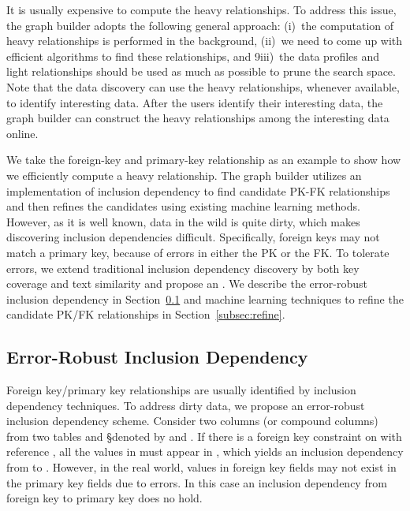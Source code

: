 It is usually expensive to compute the heavy relationships. 
To address this issue, the graph builder adopts  the following general approach: 
(i)~the computation of heavy relationships is performed in the background, 
(ii)~we need to come up with efficient algorithms to find these relationships, and
9iii)~the data profiles and light relationships should be used as much as possible to prune the search space. 
Note that the data discovery can use the heavy relationships, whenever available, to identify interesting data. 
After the users identify their interesting data, the graph builder can construct the heavy relationships among the interesting data online.


We take the foreign-key and primary-key relationship as an example to show how we efficiently compute a heavy relationship. 
The graph builder utilizes an implementation of inclusion dependency to find candidate PK-FK relationships and then refines the candidates using existing machine learning methods. 
However, as it is well known, data in the wild is quite dirty, which makes discovering inclusion dependencies difficult. Specifically, foreign keys may not match a primary key, because of errors in either the PK or the FK. To tolerate errors, we extend traditional inclusion dependency discovery by both key coverage and text similarity and propose an \emph{\eind}. We describe the error-robust inclusion dependency in Section~\ref{subsec:eind} and machine learning techniques to refine the candidate PK/FK relationships in Section~\ref{subsec:refine}.


\subsection{Error-Robust Inclusion Dependency}\label{subsec:eind}

Foreign key/primary key relationships are usually identified by inclusion dependency techniques. 
To address dirty data, we propose an error-robust inclusion dependency scheme.
Consider two columns (or compound columns) from two tables \R and \S denoted by \RX and \SY. If there is a foreign key constraint on \RX with reference \SY, all the values in \RX must appear in \SY, which yields an inclusion dependency from \RX to \SY. However, in the real world, values in foreign key fields may not exist in the primary key fields due to errors.  In this case an inclusion dependency from foreign key to primary key does no hold.

